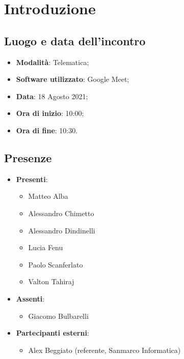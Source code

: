 \documentclass[]{article}
\begin{document}
	

	\newpage


	\section{Introduzione}
	\subsection{Luogo e data dell'incontro}
	\begin{itemize}
		\item \textbf{Modalità}: Telematica;
		\item \textbf{Software utilizzato}: Google Meet;
		\item \textbf{Data}: 18 Agosto 2021;
		\item \textbf{Ora di inizio}: 10:00;
		\item \textbf{Ora di fine}: 10:30.
	\end{itemize}

	\subsection{Presenze}
	\begin{itemize}
		\item \textbf{Presenti}:
		\begin{itemize}
			\item Matteo Alba
			\item Alessandro Chimetto
			\item Alessandro Dindinelli
			\item Lucia Fenu
			\item Paolo Scanferlato
			\item Valton Tahiraj
			

		\end{itemize}
		\item \textbf{Assenti}:
		\begin{itemize}
			
			\item Giacomo Bulbarelli

		\end{itemize}
		\item \textbf{Partecipanti esterni}:
		\begin{itemize}
			\item Alex Beggiato (referente, Sanmarco Informatica)
		\end{itemize}
	\end{itemize}
\end{document}
